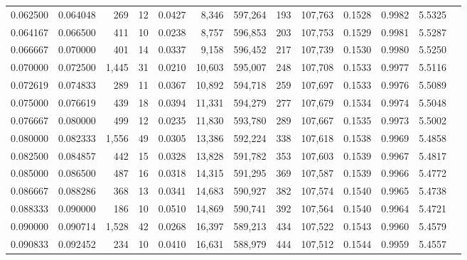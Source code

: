 \begin{tabular}{rrrrrrrrrrrrr}
0.062500 & 0.064048 &   269 &  12 &                                     0.0427 &   8,346 & 597,264 &     193 & 107,763 & 0.1528 & 0.9982 & 5.5325 \\
0.064167 & 0.066500 &   411 &  10 &                                     0.0238 &   8,757 & 596,853 &     203 & 107,753 & 0.1529 & 0.9981 & 5.5287 \\
0.066667 & 0.070000 &   401 &  14 &                                     0.0337 &   9,158 & 596,452 &     217 & 107,739 & 0.1530 & 0.9980 & 5.5250 \\
0.070000 & 0.072500 & 1,445 &  31 &                                     0.0210 &  10,603 & 595,007 &     248 & 107,708 & 0.1533 & 0.9977 & 5.5116 \\
0.072619 & 0.074833 &   289 &  11 &                                     0.0367 &  10,892 & 594,718 &     259 & 107,697 & 0.1533 & 0.9976 & 5.5089 \\
0.075000 & 0.076619 &   439 &  18 &                                     0.0394 &  11,331 & 594,279 &     277 & 107,679 & 0.1534 & 0.9974 & 5.5048 \\
0.076667 & 0.080000 &   499 &  12 &                                     0.0235 &  11,830 & 593,780 &     289 & 107,667 & 0.1535 & 0.9973 & 5.5002 \\
0.080000 & 0.082333 & 1,556 &  49 &                                     0.0305 &  13,386 & 592,224 &     338 & 107,618 & 0.1538 & 0.9969 & 5.4858 \\
0.082500 & 0.084857 &   442 &  15 &                                     0.0328 &  13,828 & 591,782 &     353 & 107,603 & 0.1539 & 0.9967 & 5.4817 \\
0.085000 & 0.086500 &   487 &  16 &                                     0.0318 &  14,315 & 591,295 &     369 & 107,587 & 0.1539 & 0.9966 & 5.4772 \\
0.086667 & 0.088286 &   368 &  13 &                                     0.0341 &  14,683 & 590,927 &     382 & 107,574 & 0.1540 & 0.9965 & 5.4738 \\
0.088333 & 0.090000 &   186 &  10 &                                     0.0510 &  14,869 & 590,741 &     392 & 107,564 & 0.1540 & 0.9964 & 5.4721 \\
0.090000 & 0.090714 & 1,528 &  42 &                                     0.0268 &  16,397 & 589,213 &     434 & 107,522 & 0.1543 & 0.9960 & 5.4579 \\
0.090833 & 0.092452 &   234 &  10 &                                     0.0410 &  16,631 & 588,979 &     444 & 107,512 & 0.1544 & 0.9959 & 5.4557 \\

\end{tabular}
